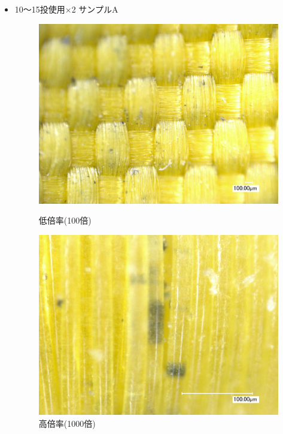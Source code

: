 \documentclass[main]{subfiles}
\begin{document}
\begin{itemize}
    \item 10～15投使用×2
    サンプルA
    \begin{figure}[H]
        \centering
        \begin{minipage}[htbp]{0.45\linewidth}
            \centering
            \includegraphics[keepaspectratio, width=0.8\linewidth]{figures/縁/カーリングパッド10-15低倍率.jpg}
            \caption{低倍率(100倍)}
            \label{fig:label}
        \end{minipage}
        \begin{minipage}[htbp]{0.45\linewidth}
            \centering
            \includegraphics[keepaspectratio, width=0.8\linewidth]{figures/縁/カーリングパッド10-15.jpg}
            \caption{高倍率(1000倍)}
            \label{fig:label}
        \end{minipage}
    \end{figure}
    

\end{itemize}
\end{document}
